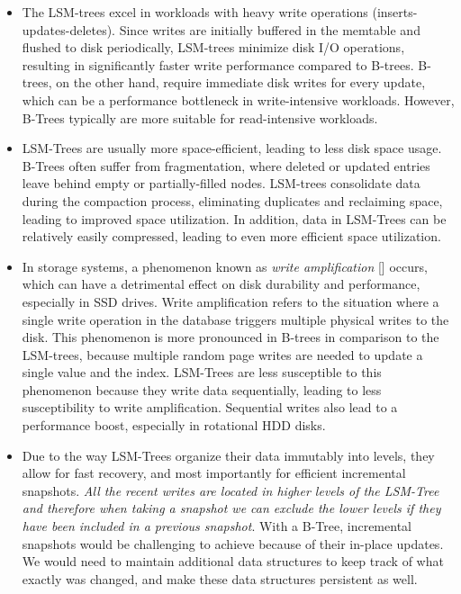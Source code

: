 \begin{itemize}
    \item The LSM-trees excel in workloads with heavy write operations (inserts-updates-deletes). Since writes are initially buffered in the memtable and flushed to disk periodically, LSM-trees minimize disk I/O operations, resulting in significantly faster write performance compared to B-trees. B-trees, on the other hand, require immediate disk writes for every update, which can be a performance bottleneck in write-intensive workloads. However, B-Trees typically are more suitable for read-intensive workloads.

    \item LSM-Trees are usually more space-efficient, leading to less disk space usage. B-Trees often suffer from fragmentation, where deleted or updated entries leave behind empty or partially-filled nodes. LSM-trees consolidate data during the compaction process, eliminating duplicates and reclaiming space, leading to improved space utilization. In addition, data in LSM-Trees can be relatively easily compressed, leading to even more efficient space utilization.

    \item In storage systems, a phenomenon known as \textit{write amplification} [\cite{write-amplification,space-amplification}] occurs, which can have a detrimental effect on disk durability and performance, especially in SSD drives. Write amplification refers to the situation where a single write operation in the database triggers multiple physical writes to the disk. This phenomenon is more pronounced in B-trees in comparison to the LSM-trees, because multiple random page writes are needed to update a single value and the index. LSM-Trees are less susceptible to this phenomenon because they write data sequentially, leading to less susceptibility to write amplification. Sequential writes also lead to a performance boost, especially in rotational HDD disks.

    \item Due to the way LSM-Trees organize their data immutably into levels, they allow for fast recovery, and most importantly for efficient incremental snapshots. \textit{All the recent writes are located in higher levels of the LSM-Tree and therefore when taking a snapshot we can exclude the lower levels if they have been included in a previous snapshot}. With a B-Tree, incremental snapshots would be challenging to achieve because of their in-place updates. We would need to maintain additional data structures to keep track of what exactly was changed, and make these data structures persistent as well.
\end{itemize}

